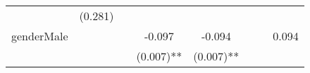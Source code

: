 \documentclass[12pt,twoside]{reedthesis}
\begin{document}
\begin{longtable}[]{@{}lccccccc@{}}
\begin{minipage}[t]{0.10\columnwidth}
  \strut
  \end{minipage} & \begin{minipage}[t]{0.10\columnwidth}\centering\strut
  (0.281)\strut
  \end{minipage}\tabularnewline
  \begin{minipage}[t]{0.11\columnwidth}\raggedright\strut
  genderMale\strut
  \end{minipage} & \begin{minipage}[t]{0.08\columnwidth}\centering\strut
  \strut
  \end{minipage} & \begin{minipage}[t]{0.10\columnwidth}\centering\strut
  \strut
  \end{minipage} & \begin{minipage}[t]{0.10\columnwidth}\centering\strut
  -0.097\strut
  \end{minipage} & \begin{minipage}[t]{0.10\columnwidth}\centering\strut
  -0.094\strut
  \end{minipage} & \begin{minipage}[t]{0.10\columnwidth}\centering\strut
  \strut
  \end{minipage} & \begin{minipage}[t]{0.10\columnwidth}\centering\strut
  \strut
  \end{minipage} & \begin{minipage}[t]{0.10\columnwidth}\centering\strut
  0.094\strut
  \end{minipage}\tabularnewline
  \begin{minipage}[t]{0.11\columnwidth}\raggedright\strut
  \strut
  \end{minipage} & \begin{minipage}[t]{0.08\columnwidth}\centering\strut
  \strut
  \end{minipage} & \begin{minipage}[t]{0.10\columnwidth}\centering\strut
  \strut
  \end{minipage} & \begin{minipage}[t]{0.10\columnwidth}\centering\strut
  (0.007)**\strut
  \end{minipage} & \begin{minipage}[t]{0.10\columnwidth}\centering\strut
  (0.007)**\strut
  \end{minipage} & \begin{minipage}[t]{0.10\columnwidth}\centering\strut
  \strut
  \end{minipage} & \begin{minipage}[t]{0.10\columnwidth}\centering\strut

\end{minipage}
\end{longtable}
\end{document}
